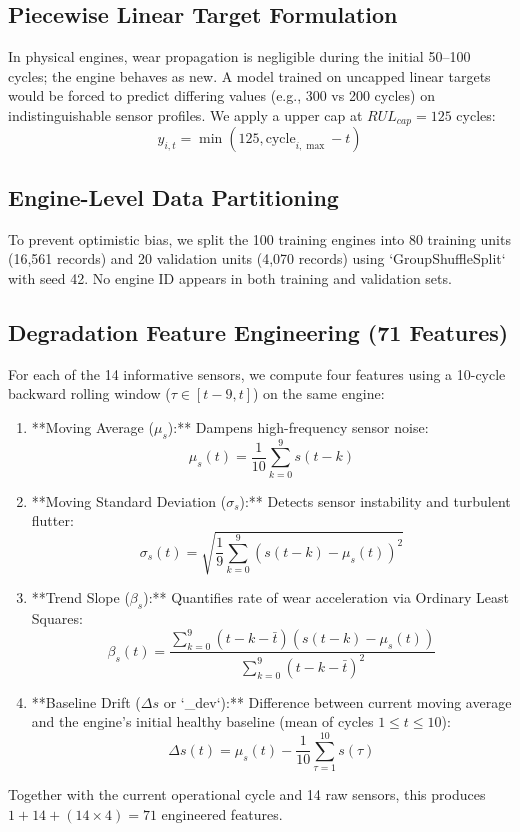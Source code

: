 \documentclass[conference]{IEEEtran}
\begin{document}
\subsection{Piecewise Linear Target Formulation}
In physical engines, wear propagation is negligible during the initial 50--100 cycles; the engine behaves as new. A model trained on uncapped linear targets would be forced to predict differing values (e.g., 300 vs 200 cycles) on indistinguishable sensor profiles. We apply a upper cap at $RUL_{cap} = 125$ cycles:
\begin{equation}
y_{i,t} = \min\left(125, \text{cycle}_{i,\max} - t\right)
\end{equation}

\subsection{Engine-Level Data Partitioning}
To prevent optimistic bias, we split the 100 training engines into 80 training units (16,561 records) and 20 validation units (4,070 records) using `GroupShuffleSplit` with seed 42. No engine ID appears in both training and validation sets.

\subsection{Degradation Feature Engineering (71 Features)}
For each of the 14 informative sensors, we compute four features using a 10-cycle backward rolling window ($\tau \in [t-9, t]$) on the same engine:
\begin{enumerate}
    \item **Moving Average ($\mu_s$):** Dampens high-frequency sensor noise:
    \begin{equation}
    \mu_s(t) = \frac{1}{10}\sum_{k=0}^{9} s(t-k)
    \end{equation}
    \item **Moving Standard Deviation ($\sigma_s$):** Detects sensor instability and turbulent flutter:
    \begin{equation}
    \sigma_s(t) = \sqrt{\frac{1}{9}\sum_{k=0}^{9}\left(s(t-k) - \mu_s(t)\right)^2}
    \end{equation}
    \item **Trend Slope ($\beta_s$):** Quantifies rate of wear acceleration via Ordinary Least Squares:
    \begin{equation}
    \beta_s(t) = \frac{\sum_{k=0}^9 (t-k - \bar{t})(s(t-k) - \mu_s(t))}{\sum_{k=0}^9 (t-k - \bar{t})^2}
    \end{equation}
    \item **Baseline Drift ($\Delta s$ or `_dev`):** Difference between current moving average and the engine's initial healthy baseline (mean of cycles $1 \le t \le 10$):
    \begin{equation}
    \Delta s(t) = \mu_s(t) - \frac{1}{10}\sum_{\tau=1}^{10} s(\tau)
    \end{equation}
\end{enumerate}
Together with the current operational cycle and 14 raw sensors, this produces $1 + 14 + (14 \times 4) = 71$ engineered features.
\end{document}
